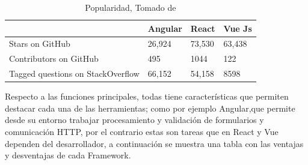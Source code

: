 \documentclass[a4paper,12 pt]{article}
\begin{document}
\begin{table}[H]
    \centering
    \small{
    \begin{tabular}{|M{5cm}|M{2.5cm}|M{2.5cm}|M{2.5cm}|}
        \hline
         &\textbf{Angular}   &\textbf{React} &\textbf{Vue Js}\\
        \hline 
            Stars on GitHub   & 26,924
        & 73,530 & 63,438
            \\
        \hline
            Contributors on GitHub & 495
        & 1044 & 122
            \\
        \hline
            Tagged questions on StackOverflow  & 66,152
        & 54,158 & 8598
            \\
        \hline
    \end{tabular}
    \caption{Popularidad, Tomado de \cite{03}}
    \label{Riesgo}}
\end{table}{}

Respecto a las funciones principales, todas tiene características que permiten
destacar cada una de las herramientas; como por ejemplo Angular,que permite
desde su entorno trabajar procesamiento y validación de formularios y
comunicación HTTP, por el contrario estas son tareas que en React y Vue dependen
del desarrollador, a continuación se muestra una tabla con las ventajas y
desventajas de cada Framework.
\end{document}
